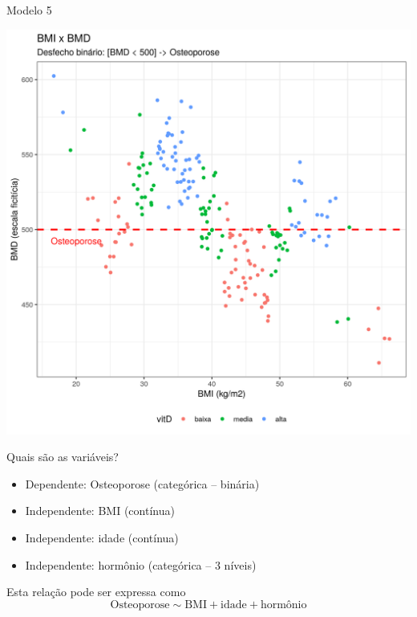 \documentclass{beamer}
\begin{document}
\begin{frame}{\small Modelo 5}
  \begin{center}
    \includegraphics[height=.9\textheight]{Cap31-32/pratica-glm5}
  \end{center}
\end{frame}

\begin{frame}{Quais são as variáveis?}
  \begin{itemize}
  \item \alert{Dependente: Osteoporose (categórica -- binária)}
  \item Independente: BMI (contínua)
  \item Independente: idade (contínua)
  \item Independente: hormônio (categórica -- 3 níveis)
  \end{itemize}
  \vfill
  \begin{block}{Esta relação pode ser expressa como}
    \begin{displaymath}
      \text{Osteoporose} \sim \text{BMI} + \text{idade} +\text{hormônio}
    \end{displaymath}
  \end{block}
\end{frame}
\end{document}
